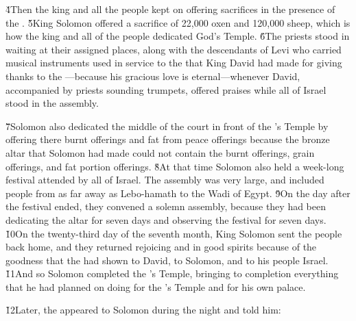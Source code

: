 \v{4}Then the king and all the people kept on offering sacrifices in the presence of the . \v{5}King Solomon offered a sacrifice of 22,000 oxen and 120,000 sheep, which is how the king and all of the people dedicated God's Temple. \v{6}The priests stood in waiting at their assigned places, along with the descendants of Levi who carried musical instruments used in service to the  that King David had made for giving thanks to the ---because his gracious love is eternal---whenever David, accompanied by priests sounding trumpets, offered praises while all of Israel stood in the assembly.

\v{7}Solomon also dedicated the middle of the court in front of the 's Temple by offering there burnt offerings and fat from peace offerings because the bronze altar that Solomon had made could not contain the burnt offerings, grain offerings, and fat portion offerings. \v{8}At that time Solomon also held a week-long festival attended by all of Israel. The assembly was very large, and included people from as far away as Lebo-hamath to the Wadi of Egypt. \v{9}On the day after the festival ended, they convened a solemn assembly, because they had been dedicating the altar for seven days and observing the festival for seven days. \v{10}On the twenty-third day of the seventh month, King Solomon sent the people back home, and they returned rejoicing and in good spirits because of the goodness that the  had shown to David, to Solomon, and to his people Israel. \v{11}And so Solomon completed the 's Temple, bringing to completion everything that he had planned on doing for the 's Temple and for his own palace.

\v{12}Later, the  appeared to Solomon during the night and told him:

